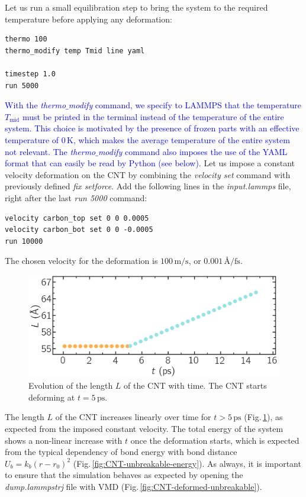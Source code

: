 \documentclass[9pt,tutorial]{livecoms}
\begin{document}
Let us run a small equilibration step to bring the system to the required temperature before applying any deformation:
{\normalsize \begin{verbatim}
thermo 100
thermo_modify temp Tmid line yaml

timestep 1.0
run 5000
\end{verbatim}}
\textcolor{blue}{With the \textit{thermo$\_$modify} command, we specify to LAMMPS that the temperature $T_\mathrm{mid}$ must be printed in the terminal instead of the temperature of the entire system. This choice is motivated by the presence of frozen parts with an effective temperature of 0\,K, which makes the average temperature of the entire system not relevant. The \textit{thermo$\_$modify} command also imposes the use of the YAML format that can easily be read by Python (see below).} Let us impose a constant velocity deformation on the CNT by combining the \textit{velocity set} command with previously defined \textit{fix setforce}. Add the following lines in the \textit{input.lammps} file, right after the last \textit{run 5000} command:
{\normalsize \begin{verbatim}
velocity carbon_top set 0 0 0.0005
velocity carbon_bot set 0 0 -0.0005
run 10000
\end{verbatim}}
\noindent The chosen velocity for the deformation is $100\,\text{m/s}$, or $0.001\,\text{\AA{}/fs}$.

\begin{figure}
\centering
\includegraphics[width=\linewidth]{CNT-lenght-unbreakable}
\caption{Evolution of the length $L$ of the CNT with time. The CNT starts deforming at $t = 5\,\text{ps}$.}
\label{fig:CNT-unbreakable-lenght}
\end{figure}

The length $L$ of the CNT increases linearly over time for $t > 5\,\text{ps}$ (Fig.\,\ref{fig:CNT-unbreakable-lenght}), as expected from the imposed constant velocity. The total energy of the system shows a non-linear increase with $t$ once the deformation starts, which is expected from the typical dependency of bond energy with bond distance $U_b = k_b \left( r - r_0 \right)^2$ (Fig.\,\ref{fig:CNT-unbreakable-energy}). As always, it is important to ensure that the simulation behaves as expected by opening the \textit{dump.lammpstrj} file with VMD (Fig.\,\ref{fig:CNT-deformed-unbreakable}).
\end{document}
